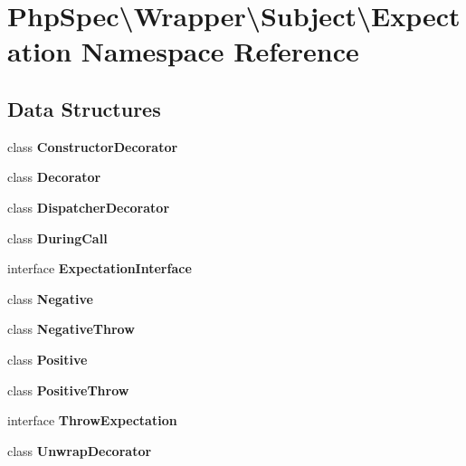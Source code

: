 \section{Php\+Spec\textbackslash{}Wrapper\textbackslash{}Subject\textbackslash{}Expectation Namespace Reference}
\label{namespace_php_spec_1_1_wrapper_1_1_subject_1_1_expectation}
\subsection*{Data Structures}
\begin{DoxyCompactItemize}
\item 
class {\bf Constructor\+Decorator}
\item 
class {\bf Decorator}
\item 
class {\bf Dispatcher\+Decorator}
\item 
class {\bf During\+Call}
\item 
interface {\bf Expectation\+Interface}
\item 
class {\bf Negative}
\item 
class {\bf Negative\+Throw}
\item 
class {\bf Positive}
\item 
class {\bf Positive\+Throw}
\item 
interface {\bf Throw\+Expectation}
\item 
class {\bf Unwrap\+Decorator}
\end{DoxyCompactItemize}
